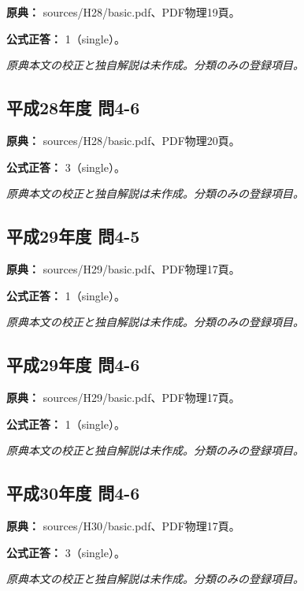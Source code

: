 \noindent\textbf{原典：} sources/H28/basic.pdf、PDF物理19頁。

\textbf{公式正答：} 1（single）。

\par\textit{原典本文の校正と独自解説は未作成。分類のみの登録項目。}

\subsection{平成28年度 問4-6}
\label{q:h28-reg-basic-4-6}

\noindent\textbf{原典：} sources/H28/basic.pdf、PDF物理20頁。

\textbf{公式正答：} 3（single）。

\par\textit{原典本文の校正と独自解説は未作成。分類のみの登録項目。}

\subsection{平成29年度 問4-5}
\label{q:h29-reg-basic-4-5}

\noindent\textbf{原典：} sources/H29/basic.pdf、PDF物理17頁。

\textbf{公式正答：} 1（single）。

\par\textit{原典本文の校正と独自解説は未作成。分類のみの登録項目。}

\subsection{平成29年度 問4-6}
\label{q:h29-reg-basic-4-6}

\noindent\textbf{原典：} sources/H29/basic.pdf、PDF物理17頁。

\textbf{公式正答：} 1（single）。

\par\textit{原典本文の校正と独自解説は未作成。分類のみの登録項目。}

\subsection{平成30年度 問4-6}
\label{q:h30-reg-basic-4-6}

\noindent\textbf{原典：} sources/H30/basic.pdf、PDF物理17頁。

\textbf{公式正答：} 3（single）。

\par\textit{原典本文の校正と独自解説は未作成。分類のみの登録項目。}

